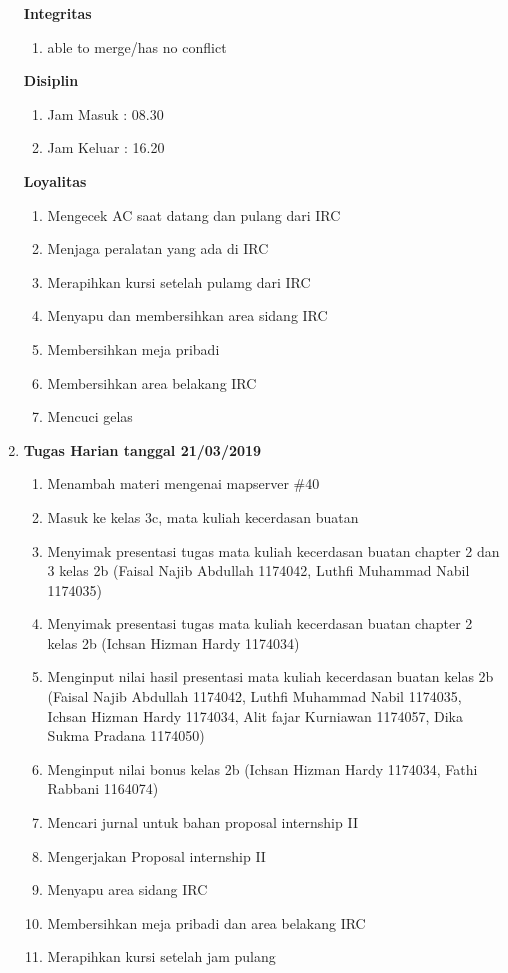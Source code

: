 \begin{enumerate}
\textbf{Integritas}
\begin{enumerate}
\item able to merge/has no conflict
\end{enumerate}

\textbf{Disiplin}
\begin{enumerate}
\item Jam Masuk : 08.30
\item Jam Keluar : 16.20
\end{enumerate}

\textbf{Loyalitas}
\begin{enumerate}
\item Mengecek AC saat datang dan pulang dari IRC
\item Menjaga peralatan yang ada di IRC
\item Merapihkan kursi setelah pulamg dari IRC
\item Menyapu dan membersihkan area sidang IRC
\item Membersihkan meja pribadi
\item Membersihkan area belakang IRC
\item Mencuci gelas
\end{enumerate}

\item \textbf{Tugas Harian tanggal 21/03/2019}
\begin{enumerate}
\item Menambah materi mengenai mapserver \#40
\item Masuk ke kelas 3c, mata kuliah kecerdasan buatan 
\item Menyimak presentasi tugas mata kuliah kecerdasan buatan chapter 2 dan 3 kelas 2b (Faisal Najib Abdullah 1174042, Luthfi Muhammad Nabil 1174035)
\item Menyimak presentasi tugas mata kuliah kecerdasan buatan chapter 2 kelas 2b (Ichsan Hizman Hardy 1174034)
\item Menginput nilai hasil presentasi mata kuliah kecerdasan buatan kelas 2b (Faisal Najib Abdullah 1174042, Luthfi Muhammad Nabil 1174035, Ichsan Hizman Hardy 1174034, Alit fajar Kurniawan 1174057, Dika Sukma Pradana 1174050)
\item Menginput nilai bonus kelas 2b (Ichsan Hizman Hardy 1174034, Fathi Rabbani 1164074)
\item Mencari jurnal untuk bahan proposal internship II
\item Mengerjakan Proposal internship II
\item Menyapu area sidang IRC
\item Membersihkan meja pribadi dan area belakang IRC
\item Merapihkan kursi setelah jam pulang 
\end{enumerate}


\end{enumerate}
